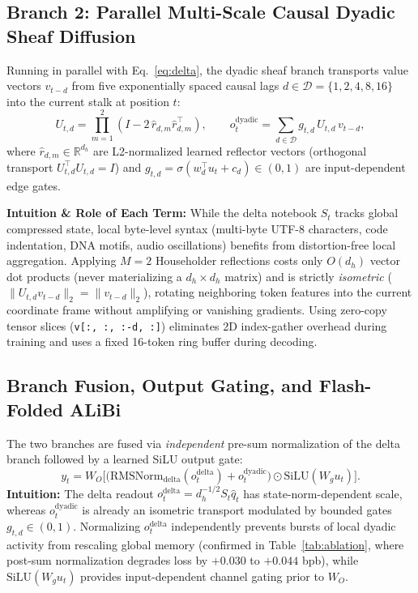 \documentclass[10pt,a4paper]{article}
\begin{document}
\subsection{Branch 2: Parallel Multi-Scale Causal Dyadic Sheaf Diffusion}
Running in parallel with Eq.~\eqref{eq:delta}, the dyadic sheaf branch transports value vectors $v_{t-d}$ from five exponentially spaced causal lags $d \in \mathcal{D} = \{1, 2, 4, 8, 16\}$ into the current stalk at position $t$:
\begin{equation}
  U_{t,d} = \prod_{m=1}^{2}\!\left(I - 2\,\hat{r}_{d,m}\hat{r}_{d,m}^\top\right), \qquad
  o_t^{\text{dyadic}} = \sum_{d \in \mathcal{D}} g_{t,d}\, U_{t,d}\, v_{t-d},
  \label{eq:dyadic}
\end{equation}
where $\hat{r}_{d,m} \in \mathbb{R}^{d_h}$ are L2-normalized learned reflector vectors (orthogonal transport $U_{t,d}^\top U_{t,d} = I$) and $g_{t,d} = \sigma(w_d^\top u_t + c_d) \in (0,1)$ are input-dependent edge gates.

\noindent\textbf{Intuition \& Role of Each Term:} While the delta notebook $S_t$ tracks global compressed state, local byte-level syntax (multi-byte UTF-8 characters, code indentation, DNA motifs, audio oscillations) benefits from distortion-free local aggregation. Applying $M=2$ Householder reflections costs only $O(d_h)$ vector dot products (never materializing a $d_h \times d_h$ matrix) and is strictly \emph{isometric} ($\|U_{t,d} v_{t-d}\|_2 = \|v_{t-d}\|_2$), rotating neighboring token features into the current coordinate frame without amplifying or vanishing gradients. Using zero-copy tensor slices (\texttt{v[:, :, :-d, :]}) eliminates 2D index-gather overhead during training and uses a fixed 16-token ring buffer during decoding.

\subsection{Branch Fusion, Output Gating, and Flash-Folded ALiBi}
The two branches are fused via \emph{independent} pre-sum normalization of the delta branch followed by a learned SiLU output gate:
\begin{equation}
  y_t = W_O \Big[\big(\text{RMSNorm}_{\text{delta}}(o_t^{\text{delta}}) + o_t^{\text{dyadic}}\big) \odot \text{SiLU}(W_g u_t)\Big].
  \label{eq:fuse}
\end{equation}
\noindent\textbf{Intuition:} The delta readout $o_t^{\text{delta}} = d_h^{-1/2} S_t \hat{q}_t$ has state-norm-dependent scale, whereas $o_t^{\text{dyadic}}$ is already an isometric transport modulated by bounded gates $g_{t,d} \in (0,1)$. Normalizing $o_t^{\text{delta}}$ independently prevents bursts of local dyadic activity from rescaling global memory (confirmed in Table~\ref{tab:ablation}, where post-sum normalization degrades loss by $+0.030$ to $+0.044$ bpb), while $\text{SiLU}(W_g u_t)$ provides input-dependent channel gating prior to $W_O$.
\end{document}
